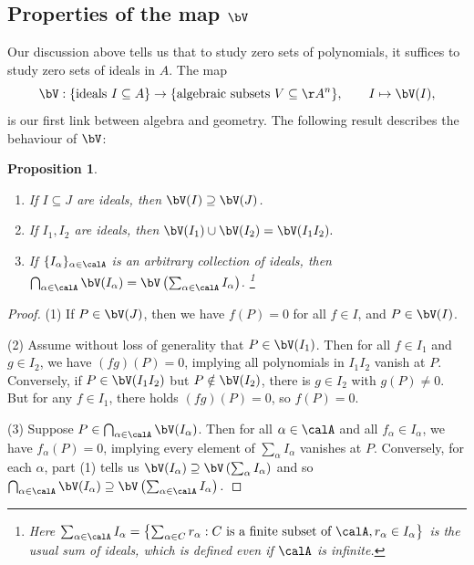 \documentclass[12pt]{amsart}
\theoremstyle{plain}
\newtheorem{proposition}[theorem]{Proposition}
\begin{document}
\subsection{Properties of the map $\bV$}
Our discussion above tells us that to study zero sets of polynomials, it suffices to study zero sets of ideals in $A$.
The map
$$\bV : \{\text{ideals } I \subseteq A\} \to \{\text{algebraic subsets } V \subseteq \AA^n\}, \qquad I \mapsto \bV(I),$$
is our first link between algebra and geometry.
The following result describes the behaviour of $\bV$:

\begin{proposition}\label{vproperties}
\begin{enumerate}
\item If $I \subseteq J$ are ideals, then $\bV(I) \supseteq \bV(J)$.
\item If $I_1, I_2$ are ideals, then $\bV(I_1) \cup \bV(I_2) = \bV(I_1 I_2).$
\item If $\{I_\alpha\}_{\alpha \in \calA}$ is an arbitrary collection of ideals, then $\bigcap_{\alpha \in \calA} \bV(I_\alpha) = \bV\left(\sum_{\alpha \in \calA} I_\alpha\right)$.
\footnote{Here $\sum_{\alpha\in\calA} I_\alpha = \left\{\sum_{\alpha \in C} r_\alpha : C \text{ is a finite subset of } \calA, r_\alpha \in I_\alpha \right\}$ is the usual sum of ideals, which is defined even if $\calA$ is infinite.}
\end{enumerate}
\end{proposition}
\begin{proof}
(1) If $P \in \bV(J)$, then we have $f(P)=0$ for all $f \in I$, and $P \in \bV(I)$.

(2) Assume without loss of generality that $P \in \bV(I_1)$.
Then for all $f \in I_1$ and $g \in I_2$, we have $(fg)(P)=0$, implying all polynomials in $I_1 I_2$ vanish at $P$.
Conversely, if $P \in \bV(I_1 I_2)$ but $P \notin \bV(I_2)$, there is $g \in I_2$ with $g(P) \ne 0$.
But for any $f \in I_1$, there holds $(fg)(P)=0$, so $f(P)=0$.

(3) Suppose $P \in \bigcap_{\alpha \in \calA} \bV(I_\alpha)$.
Then for all $\alpha \in \calA$ and all $f_\alpha \in I_\alpha$, we have $f_\alpha(P) = 0$, implying every element of $\sum_{\alpha} I_\alpha$ vanishes at $P$.
Conversely, for each $\alpha$, part (1) tells us $\bV(I_\alpha) \supseteq \bV\left(\sum_{\alpha} I_\alpha\right)$ and so 
$\bigcap_{\alpha\in\calA} \bV(I_\alpha) \supseteq \bV\left(\sum_{\alpha\in\calA} I_\alpha\right).$
\end{proof}
\end{document}
